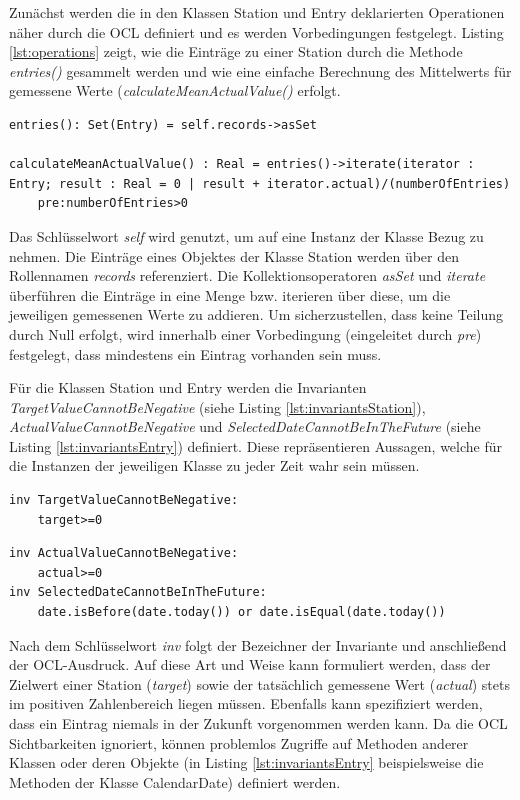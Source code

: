 \documentclass[a4paper,twoside]{article}
\begin{document}
Zunächst werden die in den Klassen Station und Entry deklarierten Operationen näher durch die OCL definiert und es werden Vorbedingungen festgelegt. Listing \ref{lst:operations} zeigt, wie die Einträge zu einer Station durch die Methode \textit{entries()} gesammelt werden und wie eine einfache Berechnung des Mittelwerts für gemessene Werte (\textit{calculateMeanActualValue()} erfolgt.  
\begin{lstlisting}[caption={OCL-erweiterte Operationen der Klasse Station},label=lst:operations]
entries(): Set(Entry) = self.records->asSet

calculateMeanActualValue() : Real = entries()->iterate(iterator : Entry; result : Real = 0 | result + iterator.actual)/(numberOfEntries) 
	pre:numberOfEntries>0
\end{lstlisting}
Das Schlüsselwort \textit{self} wird genutzt, um auf eine Instanz der Klasse Bezug zu nehmen. Die Einträge eines Objektes der Klasse Station werden über den Rollennamen \textit{records} referenziert. Die Kollektionsoperatoren \textit{asSet} und \textit{iterate} überführen die Einträge in eine Menge bzw. iterieren über diese, um die jeweiligen gemessenen Werte zu addieren. Um sicherzustellen, dass keine Teilung durch Null erfolgt, wird innerhalb einer Vorbedingung (eingeleitet durch \textit{pre}) festgelegt, dass mindestens ein Eintrag vorhanden sein muss. 

Für die Klassen Station und Entry werden die Invarianten \textit{TargetValueCannotBeNegative} (siehe Listing \ref{lst:invariantsStation}), \textit{ActualValueCannotBeNegative} und \textit{SelectedDateCannotBeInTheFuture} (siehe Listing \ref{lst:invariantsEntry}) definiert. Diese repräsentieren Aussagen, welche für die Instanzen der jeweiligen Klasse zu jeder Zeit wahr sein müssen. \cite[S.188]{OCLFormal}

\begin{lstlisting}[caption={Invariante in der Klasse Station},label=lst:invariantsStation]
inv TargetValueCannotBeNegative:
	target>=0
\end{lstlisting}
\begin{lstlisting}[caption={Invarianten in der Klasse Entry},label=lst:invariantsEntry]
inv ActualValueCannotBeNegative:
	actual>=0
inv SelectedDateCannotBeInTheFuture:
	date.isBefore(date.today()) or date.isEqual(date.today())
\end{lstlisting}

Nach dem Schlüsselwort \textit{inv} folgt der Bezeichner der Invariante und anschließend der OCL-Ausdruck. Auf diese Art und Weise kann formuliert werden, dass der Zielwert einer Station (\textit{target}) sowie der tatsächlich gemessene Wert (\textit{actual}) stets im positiven Zahlenbereich liegen müssen. Ebenfalls kann spezifiziert werden, dass ein Eintrag niemals in der Zukunft vorgenommen werden kann. Da die OCL Sichtbarkeiten ignoriert, können problemlos Zugriffe auf Methoden anderer Klassen oder deren Objekte (in Listing \ref{lst:invariantsEntry} beispielsweise die Methoden der Klasse CalendarDate) definiert werden. \cite[S.71]{OCLFormal}
\\
\end{document}

